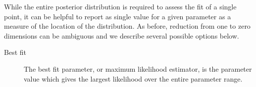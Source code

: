 While the entire posterior distribution is required to assess the fit of a single point, it can be helpful to report as single value for a given parameter as a measure of the location of the distribution. As before, reduction from one to zero dimensions can be ambiguous and we describe several possible options below.

\begin{description}
\item[Best fit] The best fit parameter, or maximum likelihood estimator, is the parameter value which gives the largest likelihood over the entire parameter range.

\end{description}

